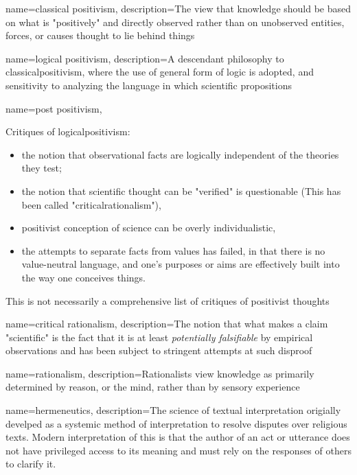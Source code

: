 {
	name={classical positivism},
	description={The view that knowledge should be based on what is "positively" and directly observed rather than on unobserved entities, forces, or causes thought to lie behind things \parencite{bredo_philosophies_2006}}
}


{
	name={logical positivism},
	description={A descendant philosophy to \gls{classicalpositivism}, where the use of general form of logic is adopted, and sensitivity to analyzing the language in which scientific propositions \parencite{bredo_philosophies_2006}}
}


{
	name={post positivism},
}
{Critiques of \gls{logicalpositivism}:
\begin{itemize}
\item the notion that observational facts are logically independent of the theories they test;
\item the notion that scientific thought can be "verified" is questionable (This has been called "\gls{criticalrationalism}"),
\item positivist conception of science can be overly individualistic, 
\item the attempts to separate facts from values has failed, in that there is no value-neutral language, and one's purposes or aims are effectively built into the way one conceives things.
\end{itemize}
This is not necessarily a comprehensive list of critiques of positivist thoughts \parencite{bredo_philosophies_2006}
}


{
	name={critical rationalism},
	description={The notion that what makes a claim "scientific" is the fact that it is at least \emph{potentially falsifiable} by empirical observations and has been subject to stringent attempts at such disproof \parencite{bredo_philosophies_2006}}	
}

{
	name=rationalism,
	description={Rationalists view knowledge as primarily determined by reason, or the mind, rather than by sensory experience}
}


{
	name={hermeneutics},
	description={The science of textual interpretation origially develped as a systemic method of interpretation to resolve disputes over religious texts. Modern interpretation of this is that the author of an act or utterance does not have privileged access to its meaning and must rely on the responses of others to clarify it.  \parencite{bredo_philosophies_2006}}
}


